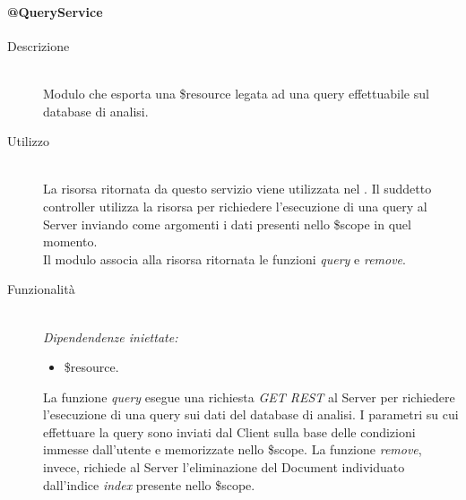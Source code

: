 \paragraph{@QueryService}
\begin{description}
 \item[Descrizione] \hfill \\
 Modulo che esporta una \$resource legata ad una query effettuabile sul database di analisi.
 \item[Utilizzo] \hfill \\
 La risorsa ritornata da questo servizio viene utilizzata nel . Il suddetto controller utilizza la risorsa per richiedere l'esecuzione 
 di una query al Server inviando come argomenti i dati presenti nello \$scope in quel momento. \\
 Il modulo associa alla risorsa ritornata le funzioni \textit{query} e \textit{remove}.
 \item[Funzionalità] \hfill \\
 \emph{Dipendendenze iniettate:}
 \begin{itemize}
  \item \$resource.
 \end{itemize}
 La funzione \textit{query} esegue una richiesta \textit{GET REST} al Server per richiedere l'esecuzione di una query sui dati del database di analisi. 
 I parametri su cui effettuare la query sono inviati dal Client sulla base delle condizioni immesse dall'utente e memorizzate nello \$scope.
 La funzione \textit{remove}, invece, richiede al Server l'eliminazione del Document individuato dall'indice \textit{index} presente nello \$scope. 
\end{description}

